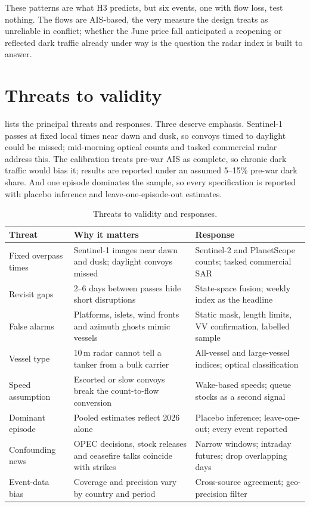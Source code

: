 \documentclass{article}
\begin{document}
These patterns are what H3 predicts, but six events, one with flow loss, test nothing. The flows are AIS-based, the very measure the design treats as unreliable in conflict; whether the June price fall anticipated a reopening or reflected dark traffic already under way is the question the radar index is built to answer.

\FloatBarrier
\section{Threats to validity}
\label{sec:threats}

 lists the principal threats and responses. Three deserve emphasis. Sentinel-1 passes at fixed local times near dawn and dusk, so convoys timed to daylight could be missed; mid-morning optical counts and tasked commercial radar address this. The calibration treats pre-war AIS as complete, so chronic dark traffic would bias it; results are reported under an assumed 5--15\% pre-war dark share. And one episode dominates the sample, so every specification is reported with placebo inference and leave-one-episode-out estimates.

\begin{table}[!tbp]
\centering
\small
\caption{Threats to validity and responses.}
\label{tab:threats}
\begin{tabularx}{\textwidth}{@{}L{3.1cm}YY@{}}
\toprule
Threat & Why it matters & Response \\
\midrule
Fixed overpass times & Sentinel-1 images near dawn and dusk; daylight convoys missed & Sentinel-2 and PlanetScope counts; tasked commercial SAR \\
 Revisit gaps & 2--6 days between passes hide short disruptions & State-space fusion; weekly index as the headline \\
False alarms & Platforms, islets, wind fronts and azimuth ghosts mimic vessels & Static mask, length limits, VV confirmation, labelled sample \\
 Vessel type & 10\,m radar cannot tell a tanker from a bulk carrier & All-vessel and large-vessel indices; optical classification \\
Speed assumption & Escorted or slow convoys break the count-to-flow conversion & Wake-based speeds; queue stocks as a second signal \\
 Dominant episode & Pooled estimates reflect 2026 alone & Placebo inference; leave-one-out; every event reported \\
Confounding news & OPEC decisions, stock releases and ceasefire talks coincide with strikes & Narrow windows; intraday futures; drop overlapping days \\
 Event-data bias & Coverage and precision vary by country and period & Cross-source agreement; geo-precision filter \\
\bottomrule
\end{tabularx}
\end{table}
\end{document}
